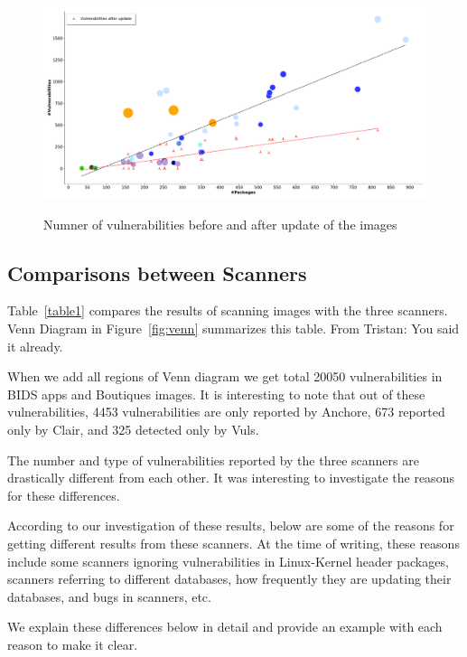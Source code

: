 \documentclass[a4paper,num-refs]{oup-contemporary}
\newcommand{\tristan}[1]{\color{blue}From Tristan: #1\color{black}}
\begin{document}
\begin{figure}[b]
        {\includegraphics[width=\textwidth]
        {Figures/vulnwithupdate.pdf}}
        \caption{\label{fig:graph2} Numner of vulnerabilities before and
        after update of the images}
      \end{figure}

\subsection{Comparisons between Scanners}

Table~\ref{table1} compares the results of scanning images with the three scanners.
Venn Diagram in Figure~\ref{fig:venn} summarizes this table. \tristan{You said it already.}

When we add all regions of Venn diagram
we get total 20050 vulnerabilities in BIDS apps and Boutiques images.
It is interesting to note that out of these vulnerabilities, 4453 vulnerabilities are only
reported by Anchore, 673 reported only by Clair, and 325 detected only by Vuls.

The number and type of vulnerabilities reported by the three scanners are drastically different from each other.
It was interesting to investigate the reasons for these differences.

According to our investigation of these results, below are some of the reasons for
getting different results from these scanners. At the time of writing, these reasons include
some scanners ignoring vulnerabilities in Linux-Kernel header packages, scanners referring to different databases,
how frequently they are updating their databases, and bugs in scanners, etc. 

We explain these differences below in detail
and provide an example with each reason to make it clear.
\end{document}
